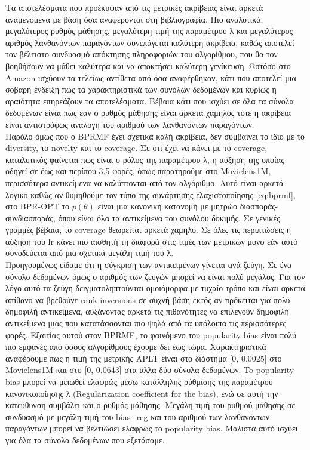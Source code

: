 \noindent Τα αποτελέσματα που προέκυψαν από τις μετρικές ακρίβειας είναι αρκετά αναμενόμενα με βάση όσα αναφέρονται στη βιβλιογραφία. Πιο αναλυτικά, μεγαλύτερος ρυθμός μάθησης, μεγαλύτερη τιμή της παραμέτρου λ και μεγαλύτερος αριθμός λανθανόντων παραγόντων συνεπάγεται καλύτερη ακρίβεια, καθώς αποτελεί τον βέλτιστο συνδυασμό απόκτησης πληροφοριών του αλγορίθμου, που θα τον βοηθήσουν να μάθει καλύτερα και να αποκτήσει καλύτερη γενίκευση. Ωστόσο στο Amazon ισχύουν τα τελείως αντίθετα από όσα αναφέρθηκαν, κάτι που αποτελεί μια σοβαρή ένδειξη πως τα χαρακτηριστικά των συνόλων δεδομένων και κυρίως η αραιότητα επηρεάζουν τα αποτελέσματα. Βέβαια κάτι που ισχύει σε όλα τα σύνολα δεδομένων είναι πως εάν ο ρυθμός μάθησης είναι αρκετά χαμηλός τότε η ακρίβεια είναι αντιστρόφως ανάλογη του αριθμού των λανθανόντων παραγόντων.\\
Παρόλο όμως που ο BPRMF έχει σχετικά καλή ακρίβεια, δεν συμβαίνει το ίδιο με το diversity, το novelty και το coverage. Σε ότι έχει να κάνει με το coverage, καταλυτικός φαίνεται πως είναι ο ρόλος της παραμέτρου λ, η αύξηση της οποίας οδηγεί σε έως και περίπου 3.5 φορές, όπως παρατηρούμε στο Movielens1M, περισσότερα αντικείμενα να καλύπτονται από τον αλγόριθμο. Αυτό είναι αρκετά λογικό καθώς αν θυμηθούμε τον τύπο της συνάρτησης ελαχιστοποίησης \eqref{eq:bprmf}, στο BPR-OPT το $ p(θ) $ είναι μια κανονική κατανομή με μητρώο διασποράς-συνδιασποράς, όπου  είναι όλα τα αντικείμενα του συνόλου δοκιμής. Σε γενικές γραμμές βέβαια, το coverage θεωρείται αρκετά χαμηλό. Σε όλες τις περιπτώσεις η αύξηση του lr κάνει πιο αισθητή τη διαφορά στις τιμές των μετρικών μόνο εάν αυτό συνοδεύεται από μια σχετικά μεγάλη τιμή του λ.\\
Προηγουμένως είδαμε ότι η σύγκριση των αντικειμένων γίνεται ανά ζεύγη. Σε ένα σύνολο δεδομένων όμως ο αριθμός των ζευγών μπορεί να είναι πολύ μεγάλος. Για τον λόγο αυτό τα ζεύγη δειγματοληπτούνται ομοιόμορφα με τυχαίο τρόπο και είναι αρκετά απίθανο να βρεθούνε rank inversions σε συχνή βάση εκτός αν πρόκειται για πολύ δημοφιλή αντικείμενα, αυξάνοντας αρκετά τις πιθανότητες να επιλεγούν δημοφιλή αντικείμενα μιας που κατατάσσονται πιο ψηλά από τα υπόλοιπα τις περισσότερες φορές. Εξαιτίας αυτού στον BPRMF, το φαινόμενο του popularity bias είναι πολύ πιο εμφανές από όσους αλγορίθμους έχουμε δει έως τώρα. Χαρακτηριστικά αναφέρουμε πως η τιμή της μετρικής APLT είναι στο διάστημα [0, 0.0025] στο Movielens1M και στο [0, 0.0643] στα άλλα δύο σύνολα δεδομένων. To popularity bias μπορεί να μειωθεί ελαφρώς μέσω κατάλληλης ρύθμισης της παραμέτρου κανονικοποίησης λ (Regularization coefficient for the bias), ενώ σε αυτή την κατεύθυνση συμβάλει και ο ρυθμός μάθησης. Μεγάλη τιμή του ρυθμού μάθησης σε συνδυασμό με μεγάλη τιμή του bias\_reg και του αριθμού των λανθανόντων παραγόντων μπορεί να βελτιώσει ελαφρώς το popularity bias. Μάλιστα αυτό ισχύει για όλα τα σύνολα δεδομένων που εξετάσαμε.\\
